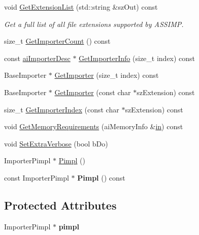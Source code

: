 \begin{DoxyCompactItemize}
\item 
void \hyperlink{classAssimp_1_1Importer_a6ab684351c55e170de3c5b7d730b306d}{\-Get\-Extension\-List} (std\-::string \&sz\-Out) const 
\begin{DoxyCompactList}\small\item\em \-Get a full list of all file extensions supported by \-A\-S\-S\-I\-M\-P. \end{DoxyCompactList}\item 
size\-\_\-t \hyperlink{classAssimp_1_1Importer_afe982451f1a1c9b0b59c788f9329ccc1}{\-Get\-Importer\-Count} () const 
\item 
const \hyperlink{structaiImporterDesc}{ai\-Importer\-Desc} $\ast$ \hyperlink{classAssimp_1_1Importer_a857dd22e071521c7747dc909f6a8f6f9}{\-Get\-Importer\-Info} (size\-\_\-t index) const 
\item 
\-Base\-Importer $\ast$ \hyperlink{classAssimp_1_1Importer_a712a0545a11c9d198392867552ba6646}{\-Get\-Importer} (size\-\_\-t index) const 
\item 
\-Base\-Importer $\ast$ \hyperlink{classAssimp_1_1Importer_a18921ab411273fa95961f60848ad6007}{\-Get\-Importer} (const char $\ast$sz\-Extension) const 
\item 
size\-\_\-t \hyperlink{classAssimp_1_1Importer_aee103460f66b9cbe3143400ec92ffc56}{\-Get\-Importer\-Index} (const char $\ast$sz\-Extension) const 
\item 
void \hyperlink{classAssimp_1_1Importer_aba2eacd0b627cb481b6d66d9ca55eac9}{\-Get\-Memory\-Requirements} (ai\-Memory\-Info \&\hyperlink{structin}{in}) const 
\item 
void \hyperlink{classAssimp_1_1Importer_a9bb793072c84c784279d0f6e870bb42d}{\-Set\-Extra\-Verbose} (bool b\-Do)
\item 
\-Importer\-Pimpl $\ast$ \hyperlink{classAssimp_1_1Importer_ac112839f323a630f83395acb74746827}{\-Pimpl} ()
\item 
\hypertarget{classAssimp_1_1Importer_a6bf9560ac8b1353ae809ff1d99c9c661}{const \-Importer\-Pimpl $\ast$ {\bfseries \-Pimpl} () const }\label{classAssimp_1_1Importer_a6bf9560ac8b1353ae809ff1d99c9c661}

\end{DoxyCompactItemize}
\subsection*{\-Protected \-Attributes}
\begin{DoxyCompactItemize}
\item 
\hypertarget{classAssimp_1_1Importer_a3928bb8d375fd676dd5dbe33382e46ce}{\-Importer\-Pimpl $\ast$ {\bfseries pimpl}}\label{classAssimp_1_1Importer_a3928bb8d375fd676dd5dbe33382e46ce}

\end{DoxyCompactItemize}


